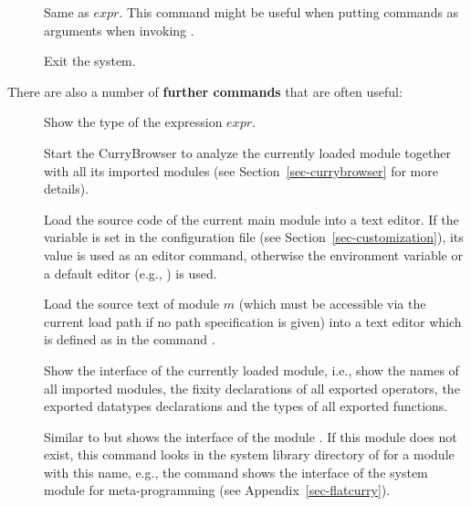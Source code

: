 \begin{description}
\item[]
Same as $expr$. This command might be useful when putting
commands as arguments when invoking .


\item[] Exit the system.
\end{description}
%
\bigskip
%
There are also a number of {\bf further commands} that are often
useful:
%
\begin{description}
\item[]
Show the type of the expression $expr$.

\item[]
Start the CurryBrowser to analyze the currently loaded
module together with all its imported modules
(see Section~\ref{sec-currybrowser} for more details).

\item[]
Load the source code of the current main module into a text editor.
If the variable  is set in the
configuration file 
(see Section~\ref{sec-customization}),
its value is used as an editor command, otherwise
the environment variable 
or a default editor (e.g., ) is used.

\item[]
Load the source text of module $m$ (which must be accessible
via the current load path if no path specification is given)
into a text editor which is defined
as in the command .

\item[]
Show the interface of the currently loaded
module, i.e., show the names of all imported modules,
the fixity declarations of all exported operators,
the exported datatypes declarations and the types
of all exported functions.

\item[]
Similar to 
but shows the interface of the module .
If this module does not exist, this command looks in the
system library directory of \CYS for a module with this name,
e.g., the command  shows the interface
of the system module  for meta-programming
(see Appendix~\ref{sec-flatcurry}).


\end{description}
